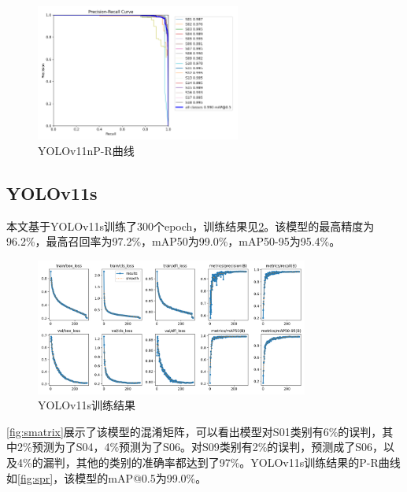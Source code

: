 \begin{figure}[H]
    \centering
    \includegraphics[width=0.6\textwidth]{figs/chap04/n_PR_curve.png}
    \caption{YOLOv11nP-R曲线}
    \label{fig:npr}
\end{figure}

\subsection{YOLOv11s}
本文基于YOLOv11s训练了300个epoch，训练结果见\ref{fig:sresult}。该模型的最高精度为96.2\%，最高召回率为97.2\%，mAP50为99.0\%，mAP50-95为95.4\%。

\begin{figure}[H]
    \centering
    \includegraphics[width=0.8\textwidth]{figs/chap04/s_results.png}
    \caption{YOLOv11s训练结果}
    \label{fig:sresult}
\end{figure}

\ref{fig:smatrix}展示了该模型的混淆矩阵，可以看出模型对S01类别有6\%的误判，其中2\%预测为了S04，4\%预测为了S06。对S09类别有2\%的误判，预测成了S06，以及4\%的漏判，其他的类别的准确率都达到了97\%。YOLOv11s训练结果的P-R曲线如\ref{fig:spr}，该模型的mAP@0.5为99.0\%。



